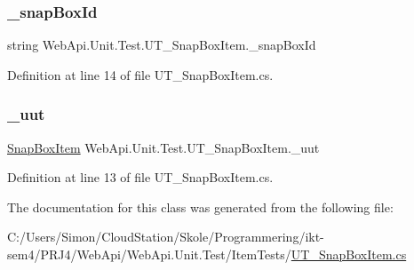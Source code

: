 \subsubsection{\texorpdfstring{\+\_\+snap\+Box\+Id}{\_snapBoxId}}
{\footnotesize\ttfamily string Web\+Api.\+Unit.\+Test.\+U\+T\+\_\+\+Snap\+Box\+Item.\+\_\+snap\+Box\+Id\hspace{0.3cm}{\ttfamily [private]}}



Definition at line 14 of file U\+T\+\_\+\+Snap\+Box\+Item.\+cs.

\mbox{\label{class_web_api_1_1_unit_1_1_test_1_1_u_t___snap_box_item_a887b7517348445390b432818617a72a8}} 
\subsubsection{\texorpdfstring{\+\_\+uut}{\_uut}}
{\footnotesize\ttfamily \mbox{\hyperlink{class_f_w_p_s_1_1_models_1_1_snap_box_item}{Snap\+Box\+Item}} Web\+Api.\+Unit.\+Test.\+U\+T\+\_\+\+Snap\+Box\+Item.\+\_\+uut\hspace{0.3cm}{\ttfamily [private]}}



Definition at line 13 of file U\+T\+\_\+\+Snap\+Box\+Item.\+cs.



The documentation for this class was generated from the following file\+:\begin{DoxyCompactItemize}
\item 
C\+:/\+Users/\+Simon/\+Cloud\+Station/\+Skole/\+Programmering/ikt-\/sem4/\+P\+R\+J4/\+Web\+Api/\+Web\+Api.\+Unit.\+Test/\+Item\+Tests/\mbox{\hyperlink{_u_t___snap_box_item_8cs}{U\+T\+\_\+\+Snap\+Box\+Item.\+cs}}\end{DoxyCompactItemize}
